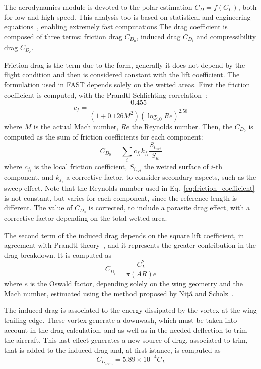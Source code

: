 The aerodynamics module is devoted to the polar estimation $C_D=f\left(C_L\right)$, both for low and high speed. 
This analysis too is based on statistical and engineering equations~\cite{bib:airbus_notes}, enabling extremely fast computations
The drag coefficient is composed of three terms: friction drag $C_{D_{0}}$, induced drag $C_{D_{i}}$ and compressibility drag $C_{D_{c}}$.

Friction drag is the term due to the form, generally it does not depend by the flight condition and then is considered constant with the lift coefficient.
The formulation used in FAST depends solely on the wetted areas. 
First the friction coefficient is computed, with the Prandtl-Schlichting correlation~\cite{bib:monaghan}:
\begin{equation}
\label{eq:friction_coefficient}
c_f = \frac{0.455}{\left(1+0.126M^2\right)\left(\log_{10}Re\right)^{2.58}}
\end{equation}
where $M$ is the actual Mach number, $Re$ the Reynolds number. 
Then, the $C_{D_0}$ is computed as the sum of friction coefficients for each component:
\begin{equation}
\label{eq:cd0}
C_{D_{0}}=\sum_{i}c_{f_{i}}k_{f_{i}}\frac{S_{i_{wet}}}{S_w}
\end{equation}
where $c_{f_{i}}$ is the local friction coefficient, $S_{i_{wet}}$ the wetted surface of $i$-th component, and $k_{f_{i}}$ a corrective factor, to consider secondary aspects, such as the sweep effect. 
Note that the Reynolds number used in Eq.~\eqref{eq:friction_coefficient} is not constant, but varies for each component, since the reference length is different. 
The value of $C_{D_{0}}$ is corrected, to include a parasite drag effect, with a corrective factor depending on the total wetted area. 

The second term of the induced drag depends on the square lift coefficient, in agreement with Prandtl theory~\cite{bib:cdn_notes, bib:anderson_aero}, and it represents the greater contribution in the drag breakdown. 
It is computed as
\begin{equation}
\label{eq:cd_induced}
C_{D_{i}}= \frac{C_L^2}{\pi \left(AR\right) e}
\end{equation}
where $e$ is the Oswald factor, depending solely on the wing geometry and the Mach number, estimated using the method proposed by Ni\c{t}\u{a} and Scholz~\cite{bib:nita}. 

The induced drag is associated to the energy dissipated by the vortex at the wing trailing edge. 
These vortex generate a downwash, which must be taken into account in the drag calculation, and as well as in the needed deflection to trim the aircraft. 
This last effect generates a new source of drag, associated to trim, that is added to the induced drag and, at first istance, is computed as
\begin{equation}
\label{eq:cd_trim}
C_{D_{trim}}= 5.89\times 10^{-4} C_L
\end{equation}

